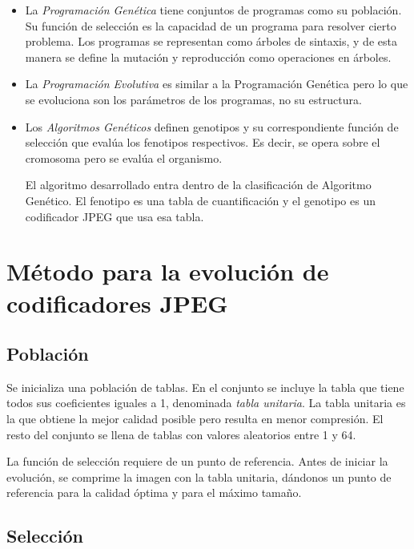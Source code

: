 \begin{itemize}
\item La \emph{Programación Genética} \cite{GenProg} tiene conjuntos de
programas como su población. Su función de selección es la capacidad de un
programa para resolver cierto problema. Los programas se representan como
árboles de sintaxis, y de esta manera se define la mutación y reproducción como
operaciones en árboles.
\item La \emph{Programación Evolutiva} es similar a la Programación Genética
pero lo que se evoluciona son los parámetros de los programas, no su
estructura.
\item Los \emph{Algoritmos Genéticos} definen genotipos y su correspondiente
función de selección que evalúa los fenotipos respectivos. Es decir, se opera
sobre el cromosoma pero se evalúa el organismo.

El algoritmo desarrollado entra dentro de la clasificación de Algoritmo
Genético. El fenotipo es una tabla de cuantificación y el genotipo es un
codificador \gls{JPEG} que usa esa tabla.

\end{itemize}

\section{Método para la evolución de codificadores JPEG}

\subsection{Población}

Se inicializa una población de tablas. En el conjunto se incluye la tabla que
tiene todos sus coeficientes iguales a 1, denominada \emph{\gls{tabla
unitaria}}. La tabla unitaria es la que obtiene la mejor calidad posible pero
resulta en menor compresión. El resto del conjunto se llena de tablas con
valores aleatorios entre 1 y 64.

La función de selección requiere de un punto de referencia. Antes de iniciar la
evolución, se comprime la imagen con la tabla unitaria, dándonos un punto de
referencia para la calidad óptima y para el máximo tamaño.

\subsection{Selección}

